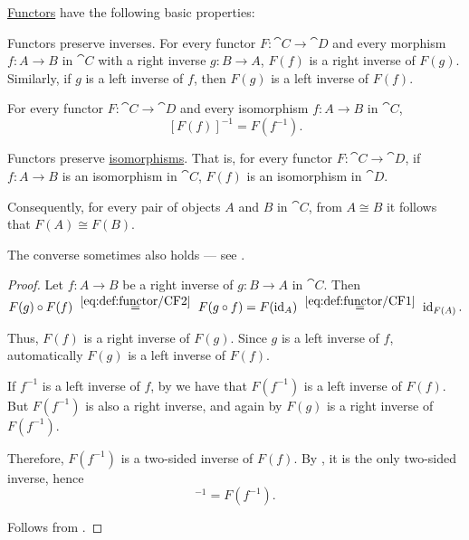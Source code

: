 \begin{proposition}\label{thm:def:functor}
  \hyperref[def:functor]{Functors} have the following basic properties:
  \begin{thmenum}
     Functors preserve inverses. For every functor \( F: \cat{C} \to \cat{D} \) and every morphism \( f: A \to B \) in \( \cat{C} \) with a right inverse \( g: B \to A \), \( F(f) \) is a right inverse of \( F(g) \). Similarly, if \( g \) is a left inverse of \( f \), then \( F(g) \) is a left inverse of \( F(f) \).

     For every functor \( F: \cat{C} \to \cat{D} \) and every isomorphism \( f: A \to B \) in \( \cat{C} \),
    \begin{equation}\label{eq:thm:def:functor/inverses}
      [F(f)]^{-1} = F(f^{-1}).
    \end{equation}

     Functors preserve \hyperref[def:morphism_invertibility/isomorphism]{isomorphisms}. That is, for every functor \( F: \cat{C} \to \cat{D} \), if \( f: A \to B \) is an isomorphism in \( \cat{C} \), \( F(f) \) is an isomorphism in \( \cat{D} \).

    Consequently, for every pair of objects \( A \) and \( B \) in \( \cat{C} \), from \( A \cong B \) it follows that \( F(A) \cong F(B) \).

    The converse sometimes also holds --- see .
  \end{thmenum}
\end{proposition}
\begin{proof}
   Let \( f: A \to B \) be a right inverse of \( g: B \to A \) in \( \cat{C} \). Then
  \begin{equation*}
    F(g) \bincirc F(f)
    \reloset {\eqref{eq:def:functor/CF2}} =
    F(g \bincirc f)
    =
    F(\id_A)
    \reloset {\eqref{eq:def:functor/CF1}} =
    \id_{F(A)}.
  \end{equation*}

  Thus, \( F(f) \) is a right inverse of \( F(g) \). Since \( g \) is a left inverse of \( f \), automatically \( F(g) \) is a left inverse of \( F(f) \).

   If \( f^{-1} \) is a left inverse of \( f \), by  we have that \( F(f^{-1}) \) is a left inverse of \( F(f) \). But \( F(f^{-1}) \) is also a right inverse, and again by  \( F(g) \) is a right inverse of \( F(f^{-1}) \).

  Therefore, \( F(f^{-1}) \) is a two-sided inverse of \( F(f) \). By , it is the only two-sided inverse, hence
  \begin{equation*}
    [F(f)]^{-1} = F(f^{-1}).
  \end{equation*}

   Follows from .
\end{proof}

